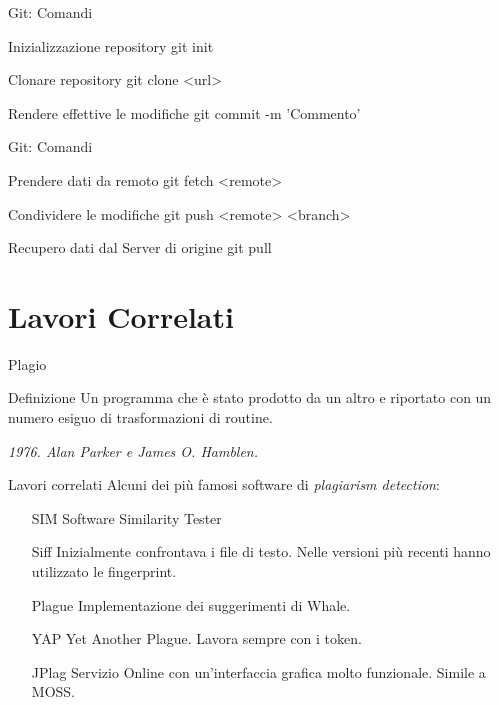\documentclass{beamer}
\newcommand\tab[1][1cm]{\hspace*{#1}}	%
\begin{document}
	\begin{frame}{Git: Comandi}
		\begin{block}{Inizializzazione repository}
			\tab git init
		\end{block}
		\pause
		\begin{block}{Clonare repository}
			\tab git clone <url>
		\end{block}
		\pause
		\begin{block}{Rendere effettive le modifiche}
			\tab git commit -m 'Commento'
		\end{block}
	\end{frame}
	
	\begin{frame}{Git: Comandi}
		\begin{block}{Prendere dati da remoto}
			\tab git fetch <remote>
		\end{block}
		\pause
		\begin{block}{Condividere le modifiche}
			\tab git push <remote> <branch>
		\end{block}
		\pause
		\begin{block}{Recupero dati dal Server di origine}
			\tab git pull
		\end{block}
	\end{frame}

	\section{Lavori Correlati}
	
	\begin{frame}{Plagio}
		\begin{alertblock}{Definizione}
			Un programma che è stato prodotto da un altro e riportato con un numero esiguo di trasformazioni di routine.
			
			\hspace{4cm}\textit{1976. Alan Parker e James O. Hamblen.}
		\end{alertblock}
		
		\vspace{-0.5cm}
		\begin{center}
		\end{center}
	\end{frame}

	\begin{frame}{Lavori correlati}
		Alcuni dei più famosi software di \textit{plagiarism detection}:
		\begin{itemize}
			\item[SIM] Software Similarity Tester
			\item[Siff] Inizialmente confrontava  i file di testo. Nelle versioni più recenti hanno utilizzato le fingerprint.
			\item[Plague] Implementazione dei suggerimenti di Whale. 
			\item[YAP] Yet Another Plague. Lavora sempre con i token.
			\item[JPlag] Servizio Online con un'interfaccia grafica molto funzionale. Simile a MOSS.
		\end{itemize}
	\end{frame}
\end{document}
